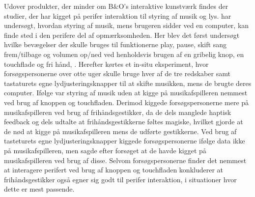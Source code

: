  Udover produkter, der minder om B$\&$O's interaktive kunstværk findes der studier, der har kigget på perifer interaktion til styring af musik og lys. \textcite{PDF:FacilitatingPIDesignAndEvaluation} har undersøgt, hvordan styring af musik, mens brugeren sidder ved en computer, kan finde sted i den perifere del af opmærksomheden. Her blev det først undersøgt hvilke bevægelser der skulle bruges til funktionerne play, pause, skift sang frem/tilbage og volumen op/ned ved henholdsvis brugen af en gribelig knop, en touchflade og fri hånd, \parencite[ss. 165-166]{PDF:FacilitatingPIDesignAndEvaluation}. Herefter kørtes et in-situ eksperiment, hvor forsøgspersonerne over otte uger skulle bruge hver af de tre redskaber samt tastaturets egne lydjusteringsknapper til at skifte musikken, mens de brugte deres computer. Ifølge \textcite[ss. 172-173]{PDF:FacilitatingPIDesignAndEvaluation} var styring af musik uden at kigge på musikafspilleren nemmest ved brug af knoppen og touchfladen. Derimod kiggede forsøgspersonerne mere på musikafspilleren ved brug af frihåndsgestikker, da de dels manglede haptisk feedback og dels udtalte at frihåndsgestikkerne føltes magiske, hvilket gjorde at de nød at kigge på musikafspilleren mens de udførte gestikkerne. Ved brug af tasteturets egne lydjusteringsknapper kiggede forsøgspersonerne ifølge data ikke på musikafspilleren, men sagde efter forsøget at de havde kigget på musikafspilleren ved brug af disse. Selvom forsøgspersonerne finder det nemmest at interagere perifert ved brug af knoppen og touchfladen konkluderer \textcite[s. 177]{PDF:FacilitatingPIDesignAndEvaluation} at frihåndsgestikker også egner sig godt til perifer interaktion, i situationer hvor dette er mest passende.
 
